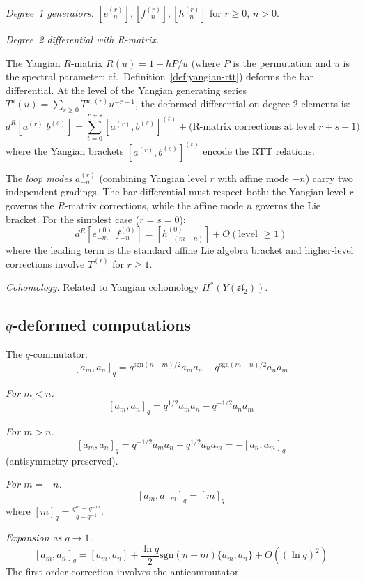 \begin{computation}\label{comp:yangian-bar-full}
\emph{Degree~1 generators.} $[e^{(r)}_{-n}], [f^{(r)}_{-n}], [h^{(r)}_{-n}]$ for $r \geq 0$, $n > 0$.

\emph{Degree~2 differential with R-matrix.}

The Yangian $R$-matrix $R(u) = 1 - \hbar P/u$ (where $P$ is the permutation and $u$ is the spectral parameter; cf.\ Definition~\ref{def:yangian-rtt}) deforms the bar differential.  At the level of the Yangian generating series $T^a(u) = \sum_{r \geq 0} T^{a,(r)} u^{-r-1}$, the deformed differential on degree-2 elements is:
\[
d^R[a^{(r)}|b^{(s)}] = \sum_{t=0}^{r+s} [a^{(r)}, b^{(s)}]^{(t)} + \text{(R-matrix corrections at level } r+s+1 \text{)}
\]
where the Yangian brackets $[a^{(r)}, b^{(s)}]^{(t)}$ encode the RTT relations.

The \emph{loop modes} $a^{(r)}_{-n}$ (combining Yangian level $r$ with affine mode $-n$) carry two independent gradings.  The bar differential must respect both: the Yangian level $r$ governs the $R$-matrix corrections, while the affine mode $n$ governs the Lie bracket.  For the simplest case ($r = s = 0$):
\[d^R[e^{(0)}_{-m}|f^{(0)}_{-n}] = [h^{(0)}_{-(m+n)}] + O(\text{level } \geq 1)\]
where the leading term is the standard affine Lie algebra bracket and higher-level corrections involve $T^{(r)}$ for $r \geq 1$.

\emph{Cohomology.} Related to Yangian cohomology $H^*(Y(\mathfrak{sl}_2))$.
\end{computation}


\subsection{\texorpdfstring{$q$-deformed computations}{q-deformed computations}}\label{sec:q-deformed-details}

\begin{computation}\label{comp:q-comm}
The $q$-commutator:
\[
[a_m, a_n]_q = q^{\mathrm{sgn}(n-m)/2} a_m a_n - q^{\mathrm{sgn}(m-n)/2} a_n a_m
\]

\emph{For $m < n$.}
\[
[a_m, a_n]_q = q^{1/2} a_m a_n - q^{-1/2} a_n a_m
\]

\emph{For $m > n$.}
\[
[a_m, a_n]_q = q^{-1/2} a_m a_n - q^{1/2} a_n a_m = -[a_n, a_m]_q
\]
(antisymmetry preserved).

\emph{For $m = -n$.}
\[
[a_m, a_{-m}]_q = [m]_q
\]
where $[m]_q = \frac{q^m - q^{-m}}{q - q^{-1}}$.

\emph{Expansion as $q \to 1$.}
\[
[a_m, a_n]_q = [a_m, a_n] + \frac{\ln q}{2}\mathrm{sgn}(n-m)\{a_m, a_n\} + O((\ln q)^2)
\]
The first-order correction involves the anticommutator.
\end{computation}


